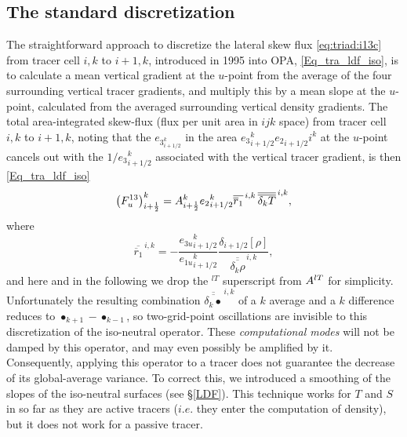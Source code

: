 \subsection{The standard discretization}
The straightforward approach to discretize the lateral skew flux
\eqref{eq:triad:i13c} from tracer cell $i,k$ to $i+1,k$, introduced in 1995
into OPA, \eqref{Eq_tra_ldf_iso}, is to calculate a mean vertical
gradient at the $u$-point from the average of the four surrounding
vertical tracer gradients, and multiply this by a mean slope at the
$u$-point, calculated from the averaged surrounding vertical density
gradients. The total area-integrated skew-flux (flux per unit area in
$ijk$ space) from tracer cell $i,k$
to $i+1,k$, noting that the $e_{{3}_{i+1/2}^k}$ in the area
$e{_{3}}_{i+1/2}^k{e_{2}}_{i+1/2}i^k$ at the $u$-point cancels out with
the $1/{e_{3}}_{i+1/2}^k$ associated with the vertical tracer
gradient, is then \eqref{Eq_tra_ldf_iso}
\begin{equation*}
  \left(F_u^{13} \right)_{i+\scriptstyle\frac{1}{2}}^k = {A}_{i+\scriptstyle\frac{1}{2}}^k
  {e_{2}}_{i+1/2}^k \overline{\overline
    r_1} ^{\,i,k}\,\overline{\overline{\delta_k T}}^{\,i,k},
\end{equation*}
where
\begin{equation*}
  \overline{\overline
   r_1} ^{\,i,k} = -\frac{{e_{3u}}_{i+1/2}^k}{{e_{1u}}_{i+1/2}^k}
  \frac{\delta_{i+1/2} [\rho]}{\overline{\overline{\delta_k \rho}}^{\,i,k}},
\end{equation*}
and here and in the following we drop the $^{lT}$ superscript from
${A^{lT}}$ for simplicity.
Unfortunately the resulting combination $\overline{\overline{\delta_k
    \bullet}}^{\,i,k}$ of a $k$ average and a $k$ difference %
reduces to $\bullet_{k+1}-\bullet_{k-1}$, so two-grid-point oscillations are
invisible to this discretization of the iso-neutral operator. These
\emph{computational modes} will not be damped by this operator, and
may even possibly be amplified by it.  Consequently, applying this
operator to a tracer does not guarantee the decrease of its
global-average variance. To correct this, we introduced a smoothing of
the slopes of the iso-neutral surfaces (see \S\ref{LDF}). This
technique works for $T$ and $S$ in so far as they are active tracers
($i.e.$ they enter the computation of density), but it does not work
for a passive tracer.

